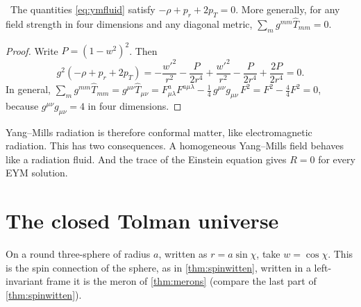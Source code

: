 \begin{proposition}[Tracelessness]\label{prop:traceless}\ver\
The quantities \eqref{eq:ymfluid} satisfy $-\rho+p_r+2p_T=0$. More generally, for any field strength in four dimensions and any diagonal metric, $\sum_mg^{mm}\hat T_{mm}=0$.
\end{proposition}
\begin{proof}
Write $P=(1-w^2)^2$. Then
\[
g^2(-\rho+p_r+2p_T)=-\frac{w'^2}{r^2}-\frac P{2r^4}+\frac{w'^2}{r^2}-\frac P{2r^4}+\frac{2P}{2r^4}=0 .
\]
In general, $\sum_mg^{mm}\hat T_{mm}=g^{\mu\nu}\hat T_{\mu\nu}=F^a_{\mu\lambda}F^{a\mu\lambda}-\frac14\,g^{\mu\nu}g_{\mu\nu}\,F^2=F^2-\frac44F^2=0$, because $g^{\mu\nu}g_{\mu\nu}=4$ in four dimensions.
\end{proof}


Yang--Mills radiation is therefore conformal matter, like electromagnetic radiation. This has two consequences. A homogeneous Yang--Mills field behaves like a radiation fluid. And the trace of the Einstein equation gives $R=0$ for every EYM solution.

\section{The closed Tolman universe}

On a round three-sphere of radius $a$, written as $r=a\sin\chi$, take $w=\cos\chi$. This is the spin connection of the sphere, as in \cref{thm:spinwitten}, written in a left-invariant frame it is the meron of \cref{thm:merons} (compare the last part of \cref{thm:spinwitten}).

